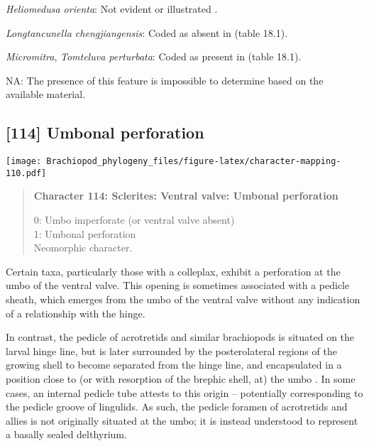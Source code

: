 \documentclass[openany]{book}
\theoremstyle{definition}
\theoremstyle{definition}
\theoremstyle{definition}
\theoremstyle{remark}
\begin{document}
\hypertarget{Heliomedusa_orienta-coding-113}{}
\emph{Heliomedusa orienta}: Not evident or illustrated
\citep{Hanken1985Thetaxonomy}.

\hypertarget{Longtancunella_chengjiangensis-coding-113}{}
\emph{Longtancunella chengjiangensis}: Coded as absent in
\citet{Bassett2001Functionalmorphology} (table 18.1).

\hypertarget{Micromitra-coding-113}{}
\emph{Micromitra}, \emph{Tomteluva perturbata}: Coded as present in
\citet{Bassett2001Functionalmorphology} (table 18.1).

\hypertarget{NA-coding-113}{}
NA: The presence of this feature is impossible to determine based on the
available material.

\subsection*{{[}114{]} Umbonal perforation}\label{umbonal-perforation}

\texttt{[image: Brachiopod\_phylogeny\_files/figure-latex/character-mapping-110.pdf]}

\begin{quote}
\textbf{Character 114: Sclerites: Ventral valve: Umbonal perforation}

0: Umbo imperforate (or ventral valve absent)\\
1: Umbonal perforation\\
Neomorphic character.
\end{quote}

Certain taxa, particularly those with a colleplax, exhibit a perforation
at the umbo of the ventral valve. This opening is sometimes associated
with a pedicle sheath, which emerges from the umbo of the ventral valve
without any indication of a relationship with the hinge.

In contrast, the pedicle of acrotretids and similar brachiopods is
situated on the larval hinge line, but is later surrounded by the
posterolateral regions of the growing shell to become separated from the
hinge line, and encapsulated in a position close to (or with resorption
of the brephic shell, at) the umbo \citep[see][pp.~407--411 and fig. 3
for discussion]{Popov1992TheCambrian}. In some cases, an internal
pedicle tube attests to this origin -- potentially corresponding to the
pedicle groove of lingulids. As such, the pedicle foramen of acrotretids
and allies is not originally situated at the umbo; it is instead
understood to represent a basally sealed delthyrium.
\end{document}
